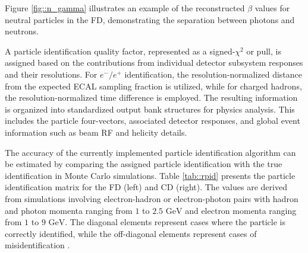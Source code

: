     Figure \ref{fig::n_gamma} illustrates an example of the reconstructed $\beta$ values for neutral particles in the FD, demonstrating the separation between photons and neutrons.

    A particle identification quality factor, represented as a signed-$\chi^2$ or pull, is assigned based on the contributions from individual detector subsystem responses and their resolutions.
    For $e^-/e^+$ identification, the resolution-normalized distance from the expected ECAL sampling fraction is utilized, while for charged hadrons, the resolution-normalized time difference is employed.
    The resulting information is organized into standardized output bank structures for physics analysis.
    This includes the particle four-vectors, associated detector responses, and global event information such as beam RF and helicity details.

    The accuracy of the currently implemented particle identification algorithm can be estimated by comparing the assigned particle identification with the true identification in Monte Carlo simulations.
    Table \ref{tab::rpid} presents the particle identification matrix for the FD (left) and CD (right).
    The values are derived from simulations involving electron-hadron or electron-photon pairs with hadron and photon momenta ranging from $1$ to $2.5 \text{ GeV}$ and electron momenta ranging from $1$ to $9 \text{ GeV}$.
    The diagonal elements represent cases where the particle is correctly identified, while the off-diagonal elements represent cases of misidentification \cite{ziegler2020}.

